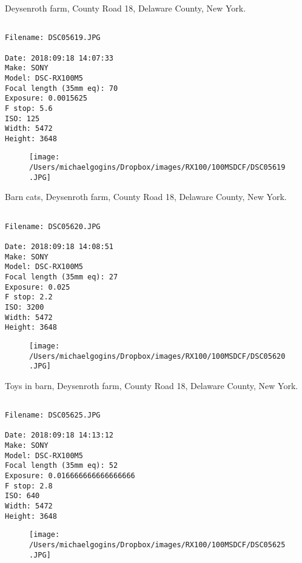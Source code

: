\clearpage
\onecolumn
\noindent Deysenroth farm, County Road 18, Delaware County, New York.
\noindent
\begin{lstlisting}

Filename: DSC05619.JPG

Date: 2018:09:18 14:07:33
Make: SONY
Model: DSC-RX100M5
Focal length (35mm eq): 70
Exposure: 0.0015625
F stop: 5.6
ISO: 125
Width: 5472
Height: 3648
\end{lstlisting}
\clearpage

\begin{figure}
\texttt{[image: /Users/michaelgogins/Dropbox/images/RX100/100MSDCF/DSC05619.JPG]}
\end{figure}
    
\clearpage
\onecolumn
\noindent Barn cats, Deysenroth farm, County Road 18, Delaware County, New York.
\noindent
\begin{lstlisting}

Filename: DSC05620.JPG

Date: 2018:09:18 14:08:51
Make: SONY
Model: DSC-RX100M5
Focal length (35mm eq): 27
Exposure: 0.025
F stop: 2.2
ISO: 3200
Width: 5472
Height: 3648
\end{lstlisting}
\clearpage

\begin{figure}
\texttt{[image: /Users/michaelgogins/Dropbox/images/RX100/100MSDCF/DSC05620.JPG]}
\end{figure}
    
\clearpage
\onecolumn
\noindent Toys in barn, Deysenroth farm, County Road 18, Delaware County, New York.
\noindent
\begin{lstlisting}

Filename: DSC05625.JPG

Date: 2018:09:18 14:13:12
Make: SONY
Model: DSC-RX100M5
Focal length (35mm eq): 52
Exposure: 0.016666666666666666
F stop: 2.8
ISO: 640
Width: 5472
Height: 3648
\end{lstlisting}
\clearpage

\begin{figure}
\texttt{[image: /Users/michaelgogins/Dropbox/images/RX100/100MSDCF/DSC05625.JPG]}
\end{figure}
    
